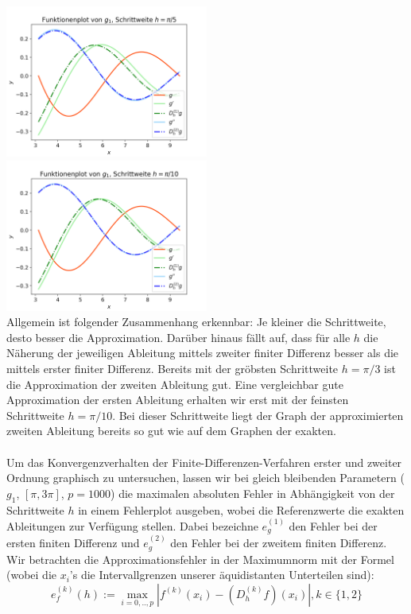 \documentclass{scrartcl}
\newcommand{\abs}[1]{\left\lvert#1\right\rvert}
\begin{document}
\includegraphics[width=0.5\textwidth]{Grafiken/Funktionenplot_Pi_Funftel} \includegraphics[width=0.5\textwidth]{Grafiken/Funktionenplot_Pi_Zehntel} \\
Allgemein ist folgender Zusammenhang erkennbar: Je kleiner die Schrittweite, desto besser die Approximation.
Darüber hinaus fällt auf, dass für alle $h$ die Näherung der jeweiligen Ableitung mittels zweiter finiter Differenz besser als die mittels erster finiter Differenz.
Bereits mit der gröbsten Schrittweite $h = \pi/3$ ist die Approximation der zweiten Ableitung gut.
Eine vergleichbar gute Approximation der ersten Ableitung erhalten wir erst mit der feinsten Schrittweite $h = \pi/10$.
Bei dieser Schrittweite liegt der Graph der approximierten zweiten Ableitung bereits so gut wie auf dem Graphen der exakten. \\
 \\
Um das Konvergenzverhalten der Finite-Differenzen-Verfahren erster und zweiter Ordnung graphisch zu untersuchen, lassen wir bei gleich bleibenden Parametern ($g_1$, $[\pi, 3\pi]$, $p = 1000$) die maximalen absoluten Fehler in Abhängigkeit von der Schrittweite $h$ in einem Fehlerplot ausgeben, wobei die Referenzwerte die exakten Ableitungen zur Verfügung stellen. Dabei bezeichne $e_g^{(1)}$ den Fehler bei der ersten finiten Differenz und $e_g^{(2)}$ den Fehler bei der zweitem finiten Differenz. Wir betrachten die Approximationsfehler in der Maximumnorm mit der Formel (wobei die $x_i$'s die Intervallgrenzen unserer äquidistanten Unterteilen sind):
\[e_f^{(k)}(h):=\max_{i=0,..,p}\abs{f^{(k)}(x_i)-(D_h^{(k)}f)(x_i)} , k \in \lbrace1, 2\rbrace\]
\end{document}
